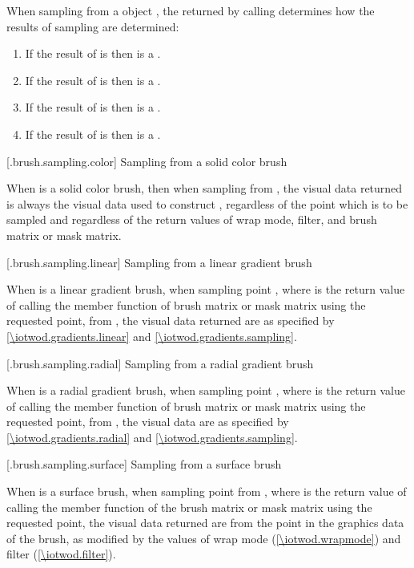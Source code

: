 \pnum
When sampling from a  object , the  returned by calling  determines how the results of sampling are determined:
\begin{enumerate}
\item If the result of  is  then  is a .
\item If the result of  is  then  is a .
\item If the result of  is  then  is a .
\item If the result of  is  then  is a .
\end{enumerate}

 [\iotwod.brush.sampling.color] {Sampling from a solid color brush}

\pnum
When  is a solid color brush, then when sampling from , the visual data returned is always the visual data used to construct , regardless of the point which is to be sampled and regardless of the return values of wrap mode, filter, and brush matrix or mask matrix.

 [\iotwod.brush.sampling.linear] {Sampling from a linear gradient brush}

\pnum
When  is a linear gradient brush, when sampling point , where  is the return value of calling the  member function of brush matrix or mask matrix using the requested point, from , the visual data returned are as specified by \ref{\iotwod.gradients.linear} and \ref{\iotwod.gradients.sampling}.

 [\iotwod.brush.sampling.radial] {Sampling from a radial gradient brush}

\pnum
When  is a radial gradient brush, when sampling point , where  is the return value of calling the  member function of brush matrix or mask matrix using the requested point, from , the visual data are as specified by \ref{\iotwod.gradients.radial} and \ref{\iotwod.gradients.sampling}.

 [\iotwod.brush.sampling.surface] {Sampling from a surface brush}

\pnum
When  is a surface brush, when sampling point  from , where  is the return value of calling the  member function of the brush matrix or mask matrix using the requested point, the visual data returned are from the point  in the graphics data of the brush, as modified by the values of wrap mode (\ref{\iotwod.wrapmode}) and filter (\ref{\iotwod.filter}).

